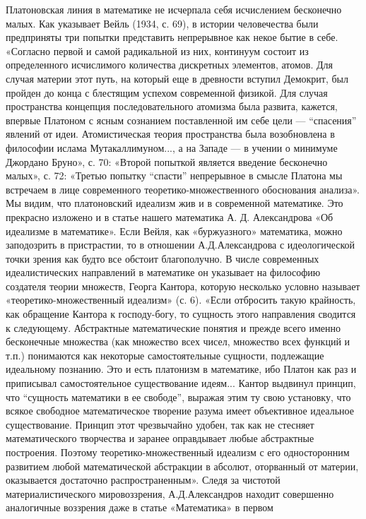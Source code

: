 Платоновская линия в математике не исчерпала себя исчислением
бесконечно малых. Как указывает Вейль (1934, с. 69), в истории
человечества были предприняты три попытки представить непрерывное как
некое бытие в себе. «Согласно первой и самой радикальной из них,
континуум состоит из определенного исчислимого количества дискретных
элементов, атомов. Для случая материи этот путь, на который еще в
древности вступил Демокрит, был пройден до конца с блестящим успехом
современной физикой. Для случая пространства концепция
последовательного атомизма была развита, кажется, впервые Платоном с
ясным сознанием поставленной им себе цели --- ``спасения'' явлений от
идеи. Атомистическая теория пространства была возобновлена в философии
ислама Мутакаллимуном..., а на Западе --- в учении о минимуме Джордано
Бруно», с. 70: «Второй попыткой является введение бесконечно малых»,
с. 72: «Третью попытку ``спасти'' непрерывное в смысле Платона мы
встречаем в лице современного теоретико-множественного обоснования
анализа». Мы видим, что платоновский идеализм жив и в современной
математике. Это прекрасно изложено и в статье нашего математика А. Д.
Александрова «Об идеализме в математике». Если Вейля, как
«буржуазного» математика, можно заподозрить в пристрастии, то в
отношении А.Д.Александрова с идеологической точки зрения как будто все
обстоит благополучно. В числе современных идеалистических направлений
в математике он указывает на философию создателя теории множеств,
Георга Кантора, которую несколько условно называет
«теоретико-множественный идеализм» (с. 6). «Если отбросить такую
крайность, как обращение Кантора к господу-богу, то сущность этого
направления сводится к следующему. Абстрактные математические понятия
и прежде всего именно бесконечные множества (как множество всех чисел,
множество всех функций и т.п.) понимаются как некоторые
самостоятельные сущности, подлежащие идеальному познанию. Это и есть
платонизм в математике, ибо Платон как раз и приписывал
самостоятельное существование идеям... Кантор выдвинул принцип, что
``сущность математики в ее свободе'', выражая этим ту свою установку,
что всякое свободное математическое творение разума имеет объективное
идеальное существование. Принцип этот чрезвычайно удобен, так как не
стесняет математического творчества и заранее оправдывает любые
абстрактные построения. Поэтому теоретико-множественный идеализм с его
односторонним развитием любой математической абстракции в абсолют,
оторванный от материи, оказывается достаточно распространенным». Следя
за чистотой материалистического мировоззрения, А.Д.Александров находит
совершенно аналогичные воззрения даже в статье «Математика» в первом
